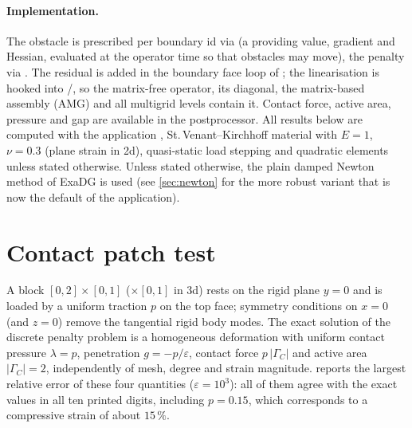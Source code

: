 \documentclass[11pt,a4paper]{article}
\begin{document}
\paragraph{Implementation.}
The obstacle is prescribed per boundary id via  (a
 providing value, gradient and Hessian, evaluated at the operator time so
that obstacles may move), the penalty via . The
residual is added in the boundary face loop of ; the linearisation is
hooked into /, so
the matrix-free operator, its diagonal, the matrix-based assembly (AMG) and all multigrid levels
contain it. Contact force, active area, pressure and gap are available in the postprocessor. All
results below are computed with the application ,
St.\,Venant--Kirchhoff material with $E=1$, $\nu=0.3$ (plane strain in 2d), quasi-static load
stepping and quadratic elements unless stated otherwise. Unless stated otherwise, the plain damped
Newton method of ExaDG is used (see \cref{sec:newton} for the more robust variant that is now the
default of the application).

\section{Contact patch test}

A block $[0,2]\times[0,1]$ ($\times[0,1]$ in 3d) rests on the rigid plane $y=0$ and is loaded by a
uniform traction $p$ on the top face; symmetry conditions on $x=0$ (and $z=0$) remove the
tangential rigid body modes. The exact solution of the discrete penalty problem is a homogeneous
deformation with uniform contact pressure $\lambda=p$, penetration $g=-p/\varepsilon$, contact
force $p\,|\Gamma_C|$ and active area $|\Gamma_C| = 2$, independently of mesh, degree and strain
magnitude.  reports the largest relative error of these four quantities
($\varepsilon=10^3$): all of them agree with the exact values in all ten printed digits, including
$p=0.15$, which corresponds to a compressive strain of about $15\,\%$.
\end{document}
